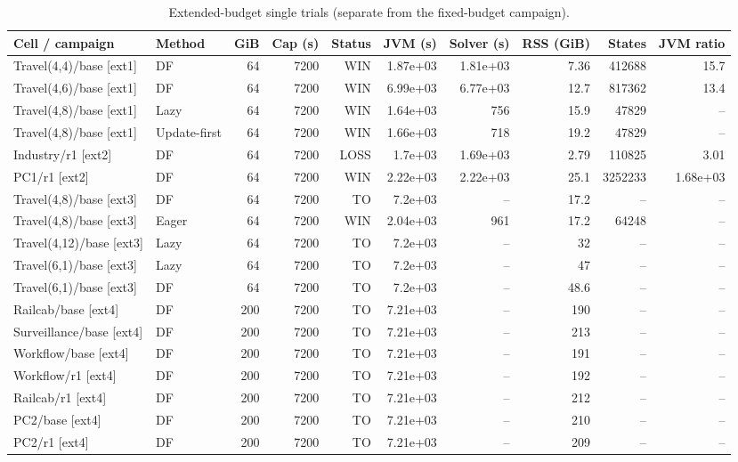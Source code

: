 \begingroup\scriptsize\setlength{\tabcolsep}{3pt}
\begin{longtable}{@{}llrrrrrrrr@{}}
\caption{Extended-budget single trials (separate from the fixed-budget campaign).}\label{tab:ext-budget}\\
\toprule Cell / campaign & Method & GiB & Cap (s) & Status & JVM (s) & Solver (s) & RSS (GiB) & States & JVM ratio\\\midrule\endhead
Travel(4,4)/base [ext1] & DF & 64 & 7200 & WIN & 1.87e+03 & 1.81e+03 & 7.36 & 412688 & 15.7\\
Travel(4,6)/base [ext1] & DF & 64 & 7200 & WIN & 6.99e+03 & 6.77e+03 & 12.7 & 817362 & 13.4\\
Travel(4,8)/base [ext1] & Lazy & 64 & 7200 & WIN & 1.64e+03 & 756 & 15.9 & 47829 & --\\
Travel(4,8)/base [ext1] & Update-first & 64 & 7200 & WIN & 1.66e+03 & 718 & 19.2 & 47829 & --\\
Industry/r1 [ext2] & DF & 64 & 7200 & LOSS & 1.7e+03 & 1.69e+03 & 2.79 & 110825 & 3.01\\
PC1/r1 [ext2] & DF & 64 & 7200 & WIN & 2.22e+03 & 2.22e+03 & 25.1 & 3252233 & 1.68e+03\\
Travel(4,8)/base [ext3] & DF & 64 & 7200 & TO & 7.2e+03 & -- & 17.2 & -- & --\\
Travel(4,8)/base [ext3] & Eager & 64 & 7200 & WIN & 2.04e+03 & 961 & 17.2 & 64248 & --\\
Travel(4,12)/base [ext3] & Lazy & 64 & 7200 & TO & 7.2e+03 & -- & 32 & -- & --\\
Travel(6,1)/base [ext3] & Lazy & 64 & 7200 & TO & 7.2e+03 & -- & 47 & -- & --\\
Travel(6,1)/base [ext3] & DF & 64 & 7200 & TO & 7.2e+03 & -- & 48.6 & -- & --\\
Railcab/base [ext4] & DF & 200 & 7200 & TO & 7.21e+03 & -- & 190 & -- & --\\
Surveillance/base [ext4] & DF & 200 & 7200 & TO & 7.21e+03 & -- & 213 & -- & --\\
Workflow/base [ext4] & DF & 200 & 7200 & TO & 7.21e+03 & -- & 191 & -- & --\\
Workflow/r1 [ext4] & DF & 200 & 7200 & TO & 7.21e+03 & -- & 192 & -- & --\\
Railcab/r1 [ext4] & DF & 200 & 7200 & TO & 7.21e+03 & -- & 212 & -- & --\\
PC2/base [ext4] & DF & 200 & 7200 & TO & 7.21e+03 & -- & 210 & -- & --\\
PC2/r1 [ext4] & DF & 200 & 7200 & TO & 7.21e+03 & -- & 209 & -- & --\\

\end{longtable}
